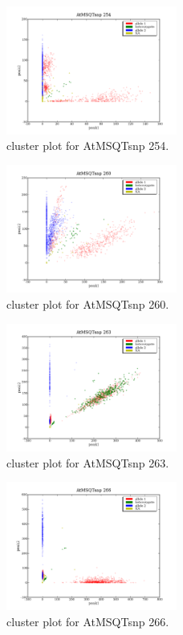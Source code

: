 \begin{figure}[H]
\includegraphics[width=0.5\textwidth]{figures/cluster_plot_AtMSQTsnp_254.png}
\caption{cluster plot for AtMSQTsnp 254.} \label{flAtMSQTsnp254}
\end{figure}
\begin{figure}[H]
\includegraphics[width=0.5\textwidth]{figures/cluster_plot_AtMSQTsnp_260.png}
\caption{cluster plot for AtMSQTsnp 260.} \label{flAtMSQTsnp260}
\end{figure}
\begin{figure}[H]
\includegraphics[width=0.5\textwidth]{figures/cluster_plot_AtMSQTsnp_263.png}
\caption{cluster plot for AtMSQTsnp 263.} \label{flAtMSQTsnp263}
\end{figure}
\begin{figure}[H]
\includegraphics[width=0.5\textwidth]{figures/cluster_plot_AtMSQTsnp_266.png}
\caption{cluster plot for AtMSQTsnp 266.} \label{flAtMSQTsnp266}
\end{figure}
